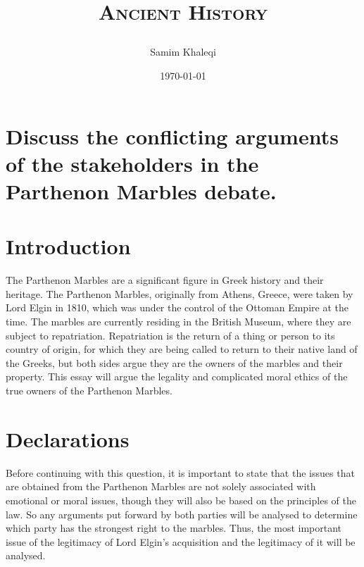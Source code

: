 \documentclass[12pt, letterpaper]{article}
\title{\Huge\center{Parthenon Marbles and Their Repatriation}

\Large\scshape{Ancient History}}
\author{Samim Khaleqi}
\date{\today}
\begin{document}
\maketitle

\pagebreak
\tableofcontents
\pagebreak

\section*{Discuss the conflicting arguments of the stakeholders in the Parthenon Marbles debate.}

\section*{Introduction}
    The Parthenon Marbles are a significant figure in Greek history and their heritage. The Parthenon Marbles, originally from Athens, Greece, were taken by Lord Elgin in 1810, which was under the control of the Ottoman Empire at the time. The marbles are currently residing in the British Museum, where they are subject to repatriation. Repatriation is the return of a thing or person to its country of origin, for which they are being called to return to their native land of the Greeks, but both sides argue they are the owners of the marbles and their property. This essay will argue the legality and complicated moral ethics of the true owners of the Parthenon Marbles.

\section*{Declarations}
    Before continuing with this question, it is important to state that the issues that are obtained from the Parthenon Marbles are not solely associated with emotional or moral issues, though they will also be based on the principles of the law. So any arguments put forward by both parties will be analysed to determine which party has the strongest right to the marbles. Thus, the most important issue of the legitimacy of Lord Elgin’s acquisition and the legitimacy of it will be analysed.
\end{document}
